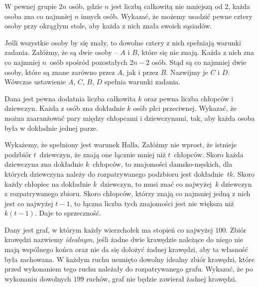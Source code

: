 \newpage
{}

\begin{problem}{1}
	W pewnej grupie $2n$ osób, gdzie $n$ jest liczbą całkowitą nie mniejszą od $2$, każda osoba zna co najmniej $n$ innych osób. Wykazać, że możemy usadzić pewne cztery osoby przy okrągłym stole, aby każda z nich znała swoich sąsiadów.
\end{problem}

\noindent
Jeśli wszystkie osoby by się znały, to dowolne cztery z nich spełniają warunki zadania. Załóżmy, że są dwie osoby -- $A$ i $B$, które się nie znają. Każda z nich zna co najmniej $n$~osób spośród pozostałych $2n - 2$ osób. Stąd są co najmniej dwie osoby, które są znane zarówno przez $A$, jak i przez $B$. Nazwijmy je $C$ i $D$. Wówczas ustawienie $A$, $C$, $B$, $D$ spełnia warunki zadania. 

\vspace{5px}

\begin{problem}{2}
	Dana jest pewna dodatnia liczba całkowita $k$ oraz pewna liczba chłopców i dziewczyn. Każda z osób zna dokładnie $k$ osób płci przeciwnej. Wykazać, że można zaaranżować pary między chłopcami i dziewczynami, tak, aby każda osoba była w dokładnie jednej parze.
\end{problem}

\noindent
Wykażemy, że spełniony jest warunek Halla. Załóżmy nie wprost, że istnieje podzbiór $t$~dziewczyn, że znają one łącznie mniej niż $t$~chłopców. Skoro każda dziewczyna zna dokładnie $k$~chłopców, to znajomości damsko-męskich, dla których dziewczyna należy do rozpatrywanego podzbioru jest dokładnie~$tk$. Skoro każdy chłopiec na dokładnie $k$~dziewczyn, to musi znać co najwyżej~$k$ dziewczyn z rozpatrywanego zbioru. Skoro chłopców, którzy znają co najmniej jedną z nich jest co najwyżej $t - 1$, to łączna liczba tych znajomości jest nie większa niż $k(t - 1)$. Daje to sprzeczność.

\vspace{5px}

\begin{problem}{3}
	Dany jest graf, w którym każdy wierzchołek ma stopień co najwyżej $100$. Zbiór krawędzi nazwiemy \textit{idealnym}, jeśli żadne dwie krawędzie należące do niego nie mają wspólnego końca oraz nie da się dołożyć żadnej krawędzi, aby ta własność była zachowana. W każdym ruchu usunięto dowolny  idealny zbiór krawędzi, które przed wykonaniem tego ruchu należały do rozpatrywanego grafu. Wykazać, że po wykonaniu dowolnych $199$ ruchów, graf nie będzie zawierał żadnej krawędzi.
\end{problem}

